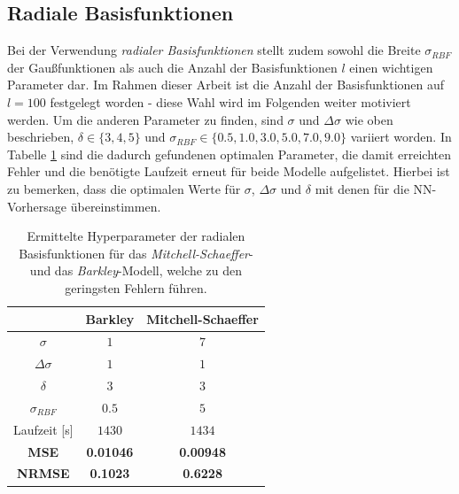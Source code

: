 \FloatBarrier
\subsection{Radiale Basisfunktionen}
Bei der Verwendung \textit{radialer Basisfunktionen} stellt zudem sowohl die Breite $\sigma_{RBF}$ der Gaußfunktionen als auch die Anzahl der Basisfunktionen $l$ einen wichtigen Parameter dar. Im Rahmen dieser Arbeit ist die Anzahl der Basisfunktionen auf $l=100$ festgelegt worden - diese Wahl wird im Folgenden weiter motiviert werden. Um die anderen Parameter zu finden, sind $\sigma$ und $\Delta \sigma$ wie oben beschrieben, $\delta \in \{3,4,5\}$ und $\sigma_{RBF} \in \{0.5, 1.0, 3.0, 5.0, 7.0, 9.0\}$ variiert worden. In Tabelle \ref{tab:exp_cross_rbf_results} sind die dadurch gefundenen optimalen Parameter, die damit erreichten Fehler und die benötigte Laufzeit erneut für beide Modelle aufgelistet. Hierbei ist zu bemerken, dass die optimalen Werte für $\sigma$, $\Delta \sigma$ und $\delta$ mit denen für die NN-Vorhersage übereinstimmen. 

\begin{table}[h]
	\centering

	\begin{tabular}{ccc}
		\hline 			
		\multicolumn{1}{c}{} & Barkley & Mitchell-Schaeffer \\ 
		\hline 
		\rule[-1ex]{0pt}{2.5ex} $\sigma$ & $1$ & $7$ \\ 
		\rule[-1ex]{0pt}{2.5ex} $\Delta \sigma$ & $1$ & $1$ \\ 
		\rule[-1ex]{0pt}{2.5ex} $\delta$ & $3$ & $3$ \\ 
		\rule[-1ex]{0pt}{2.5ex} $\sigma_{RBF}$ & $0.5$ & $5$ \\ 
		\rule[-1ex]{0pt}{2.5ex} Laufzeit [s] & $1430$ & $1434$ \\ 
		\rule[-1ex]{0pt}{2.5ex} \textbf{MSE} & \textbf{0.01046} & \textbf{0.00948} \\ 
		\rule[-1ex]{0pt}{2.5ex} \textbf{NRMSE} & \textbf{0.1023} & \textbf{0.6228} \\ 
		\hline 
	\end{tabular} 
	\caption{Ermittelte Hyperparameter der radialen Basisfunktionen für das \textit{Mitchell-Schaeffer}- und das \textit{Barkley}-Modell, welche zu den geringsten Fehlern führen.}
	\label{tab:exp_cross_rbf_results}
\end{table} 

